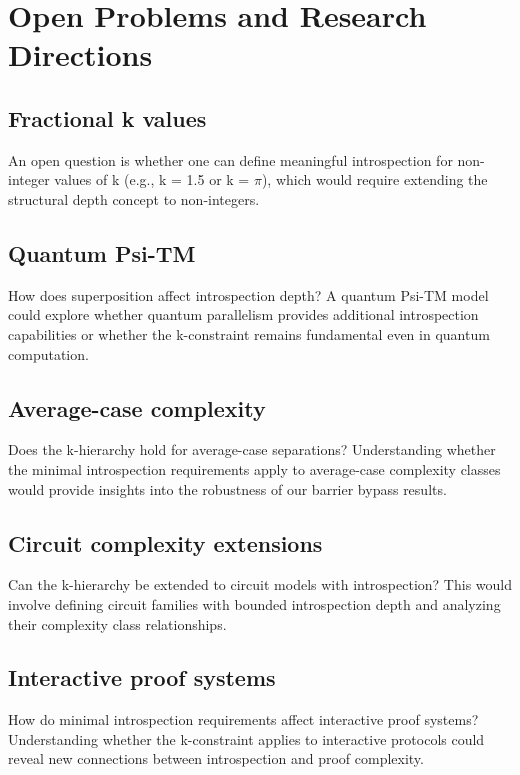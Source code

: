 \documentclass[11pt]{article}
\theoremstyle{plain}
\theoremstyle{definition}
\begin{document}


\section{Open Problems and Research Directions}

\subsection{Fractional k values}
An open question is whether one can define meaningful introspection for non-integer values of k (e.g., k = 1.5 or k = $\pi$), which would require extending the structural depth concept to non-integers.

\subsection{Quantum Psi-TM}
How does superposition affect introspection depth? A quantum Psi-TM model could explore whether quantum parallelism provides additional introspection capabilities or whether the k-constraint remains fundamental even in quantum computation.

\subsection{Average-case complexity}
Does the k-hierarchy hold for average-case separations? Understanding whether the minimal introspection requirements apply to average-case complexity classes would provide insights into the robustness of our barrier bypass results.

\subsection{Circuit complexity extensions}
Can the k-hierarchy be extended to circuit models with introspection? This would involve defining circuit families with bounded introspection depth and analyzing their complexity class relationships.

\subsection{Interactive proof systems}
How do minimal introspection requirements affect interactive proof systems? Understanding whether the k-constraint applies to interactive protocols could reveal new connections between introspection and proof complexity.
\end{document}

